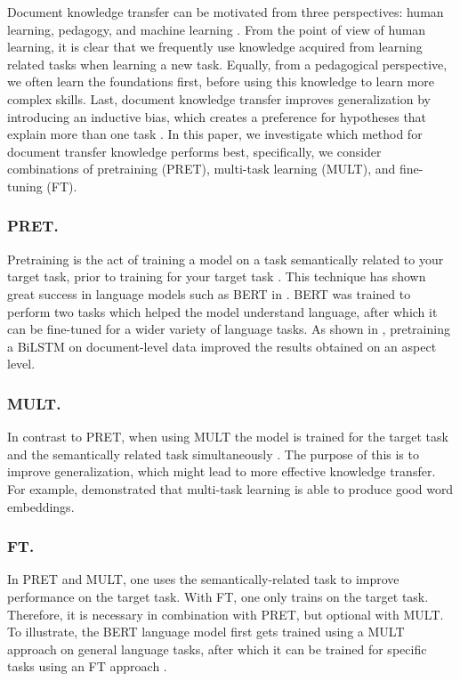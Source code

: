 Document knowledge transfer can be motivated from three perspectives: human learning, pedagogy, and machine learning \cite{Ruder2019}. From the point of view of human learning, it is clear that we frequently use knowledge acquired from learning related tasks when learning a new task. Equally, from a pedagogical perspective, we often learn the foundations first, before using this knowledge to learn more complex skills. Last, document knowledge transfer improves generalization by introducing an inductive bias, which creates a preference for hypotheses that explain more than one task \cite{Caruana1993}. In this paper, we investigate which method for document transfer knowledge performs best, specifically, we consider combinations of pretraining (PRET), multi-task learning (MULT), and fine-tuning (FT). 

\subsubsection{PRET.}
Pretraining is the act of training a model on a task semantically related to your target task, prior to training for your target task \cite{Ruder2019, He2018}. This technique has shown great success in language models such as BERT in \cite{Devlin2019}. BERT was trained to perform two tasks which helped the model understand language, after which it can be fine-tuned for a wider variety of language tasks. As shown in \cite{He2018}, pretraining a BiLSTM on document-level data improved the results obtained on an aspect level. 

\subsubsection{MULT.}
In contrast to PRET, when using MULT the model is trained for the target task and the semantically related task simultaneously \cite{Ruder2019}. The purpose of this is to improve generalization, which might lead to more effective knowledge transfer. For example, \cite{Subramanian2018} demonstrated that multi-task learning is able to produce good word embeddings.

\subsubsection{FT.}
In PRET and MULT, one uses the semantically-related task to improve performance on the target task. With FT, one only trains on the target task. Therefore, it is necessary in combination with PRET, but optional with MULT. To illustrate, the BERT language model first gets trained using a MULT approach on general language tasks, after which it can be trained for specific tasks using an FT approach \cite{Devlin2019}.

